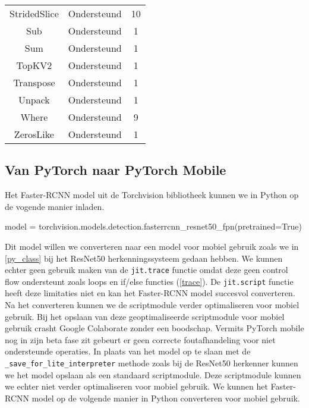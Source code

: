 \begin{table}[!ht]
\begin{tabular}{ccc}
    StridedSlice & Ondersteund & 10 \\
    Sub & Ondersteund & 1 \\
    Sum & Ondersteund & 1 \\
    TopKV2 & Ondersteund & 1 \\
    Transpose & Ondersteund & 1 \\
    Unpack & Ondersteund & 1 \\
    Where & Ondersteund & 9 \\
    ZerosLike & Ondersteund & 1 \\
    \hline
\end{tabular}
\label{tab:TF_det_op}
\end{table}

\subsection{Van PyTorch naar PyTorch Mobile}
Het Faster-RCNN model uit de Torchvision bibliotheek kunnen we in Python op de vogende manier inladen.

\begin{python}
model = torchvision.models.detection.fasterrcnn_resnet50_fpn(pretrained=True)
\end{python}

Dit model willen we converteren naar een model voor mobiel gebruik zoals we in \ref{py_class} bij het ResNet50 herkenningssysteem gedaan hebben. 
We kunnen echter geen gebruik maken van de \texttt{jit.trace} functie omdat deze geen control flow ondersteunt zoals loops en if/else functies (\ref{trace}).
De \texttt{jit.script} functie heeft deze limitaties niet en kan het Faster-RCNN model succesvol converteren.
Na het converteren kunnen we de scriptmodule verder optimaliseren voor mobiel gebruik.
Bij het opslaan van deze geoptimaliseerde scriptmodule voor mobiel gebruik crasht Google Colaborate zonder een boodschap.
Vermits PyTorch mobile nog in zijn beta fase zit gebeurt er geen correcte foutafhandeling voor niet ondersteunde operaties.
In plaats van het model op te slaan met de \texttt{\_save\_for\_lite\_interpreter} methode zoals bij de ResNet50 herkenner kunnen we het model opslaan als een standaard scriptmodule.
Deze scriptmodule kunnen we echter niet verder optimaliseren voor mobiel gebruik.
We kunnen het Faster-RCNN model op de volgende manier in Python converteren voor mobiel gebruik.

